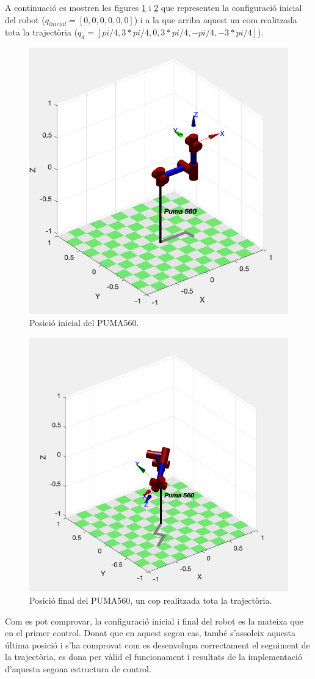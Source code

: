 \documentclass[]{article}
\begin{document}
A continuació es mostren les figures \ref{fig:Inverse_dynamics_initial} i \ref{fig:Inverse_dynamics_final} que representen la configuració inicial del robot ($q_{inicial} = [0,0,0,0,0,0]$) i a la que arriba aquest un com realitzada tota la trajectòria ($q_{d} =[pi/4,3*pi/4,0,3*pi/4,-pi/4,-3*pi/4]$).

\begin{figure}[H]
\centering
    \includegraphics[width = 0.6\linewidth]{images/PD_Robot_Initial_q.png}
    \caption{Posició inicial del PUMA560.}
    \label{fig:Inverse_dynamics_initial}
\end{figure}

\begin{figure}[H]
\centering
    \includegraphics[width = 0.6\linewidth]{images/PD_Robot_final_q.png}
    \caption{Posició final del PUMA560, un cop realitzada tota la trajectòria.}
    \label{fig:Inverse_dynamics_final}
\end{figure}

Com es pot comprovar, la configuració inicial i final del robot es la mateixa que en el primer control. Donat que en aquest segon cas, també s'assoleix aquesta última posició i s'ha comprovat com es desenvolupa correctament el seguiment de la trajectòria, es dona per vàlid el funcionament i resultats de la implementació d'aquesta segona estructura de control.
\end{document}
